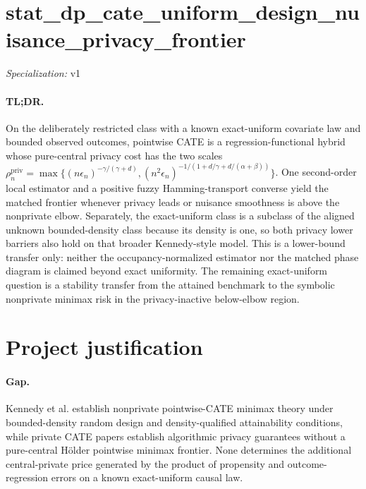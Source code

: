 \documentclass{article}
\begin{document}
\sloppy

\section*{stat\_\allowbreak{}dp\_\allowbreak{}cate\_\allowbreak{}uniform\_\allowbreak{}design\_\allowbreak{}nuisance\_\allowbreak{}privacy\_\allowbreak{}frontier}

\noindent\textit{Specialization:} v1\par

\paragraph{TL;DR.} On the deliberately restricted class with a known exact-uniform covariate law and bounded observed outcomes, pointwise CATE is a regression-functional hybrid whose pure-central privacy cost has the two scales \(\rho_n^{\mathrm{priv}}=\max\{(n\epsilon_n)^{-\gamma/(\gamma+d)},(n^2\epsilon_n)^{-1/(1+d/\gamma+d/(\alpha+\beta))}\}\). One second-order local estimator and a positive fuzzy Hamming-transport converse yield the matched frontier whenever privacy leads or nuisance smoothness is above the nonprivate elbow. Separately, the exact-uniform class is a subclass of the aligned unknown bounded-density class because its density is one, so both privacy lower barriers also hold on that broader Kennedy-style model. This is a lower-bound transfer only: neither the occupancy-normalized estimator nor the matched phase diagram is claimed beyond exact uniformity. The remaining exact-uniform question is a stability transfer from the attained benchmark to the symbolic nonprivate minimax risk in the privacy-inactive below-elbow region.

\section{Project justification}

\paragraph{Gap.} Kennedy et al. establish nonprivate pointwise-CATE minimax theory under bounded-density random design and density-qualified attainability conditions, while private CATE papers establish algorithmic privacy guarantees without a pure-central Hölder pointwise minimax frontier. None determines the additional central-private price generated by the product of propensity and outcome-regression errors on a known exact-uniform causal law.
\end{document}
